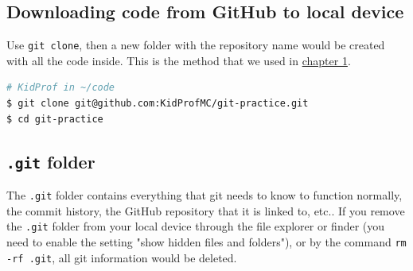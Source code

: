 \subsection{Downloading code from GitHub to local device}

Use \texttt{git clone}, then a new folder with the repository name would be created with all the code inside. This is the method that we used in \hyperref[sec:install7]{chapter 1}.

\begin{lstlisting}[language=bash]
# KidProf in ~/code
$ git clone git@github.com:KidProfMC/git-practice.git
$ cd git-practice
\end{lstlisting}

\subsection{\texttt{.git} folder}

The \texttt{.git} folder contains everything that git needs to know to function normally, the commit history, the GitHub repository that it is linked to, etc.. If you remove the \texttt{.git} folder from your local device through the file explorer or finder (you need to enable the setting "show hidden files and folders"), or by the command \texttt{rm -rf .git}, all git information would be deleted.

